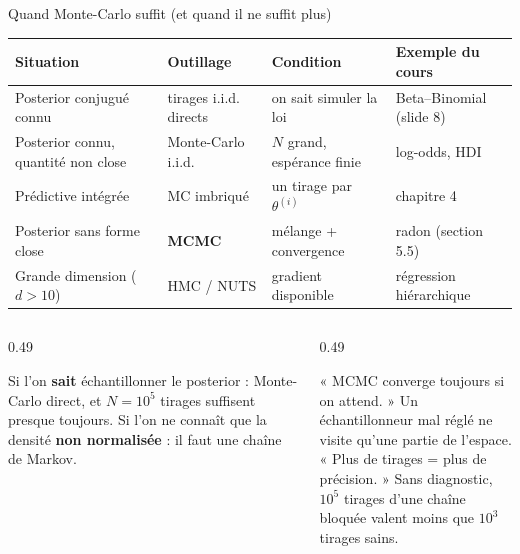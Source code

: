 \begin{frame}{Quand Monte-Carlo suffit (et quand il ne suffit plus)}
\footnotesize
\begin{center}
\footnotesize
\begin{tabular}{@{}p{3.1cm}p{3.2cm}p{3.0cm}p{3.4cm}@{}}
\toprule
\textbf{Situation} & \textbf{Outillage} & \textbf{Condition} & \textbf{Exemple du cours} \\
\midrule
Posterior conjugué connu & tirages i.i.d. directs & on sait simuler la loi & Beta--Binomial (slide 8) \\[1.5mm]
Posterior connu, quantité non close & Monte-Carlo i.i.d. & $N$ grand, espérance finie & log-odds, HDI \\[1.5mm]
Prédictive intégrée & MC imbriqué & un tirage par $\theta^{(i)}$ & chapitre 4 \\[1.5mm]
Posterior sans forme close & \textbf{MCMC} & mélange + convergence & radon (section 5.5) \\[1.5mm]
Grande dimension ($d > 10$) & HMC / NUTS & gradient disponible & régression hiérarchique \\
\bottomrule
\end{tabular}
\end{center}
\vspace{2mm}
\begin{columns}[t]
\begin{column}{0.49\textwidth}
\begin{kbox}
Si l'on \textbf{sait} échantillonner le posterior : Monte-Carlo direct, et
$N = 10^5$ tirages suffisent presque toujours. Si l'on ne connaît que la densité
\textbf{non normalisée} : il faut une chaîne de Markov.
\end{kbox}
\end{column}
\begin{column}{0.49\textwidth}
\begin{wbox}
\nok{} « MCMC converge toujours si on attend. » Un échantillonneur mal réglé ne
visite qu'une partie de l'espace.\\[1mm]
\nok{} « Plus de tirages = plus de précision. » Sans diagnostic, $10^5$ tirages
d'une chaîne bloquée valent moins que $10^3$ tirages sains.
\end{wbox}
\end{column}
\end{columns}
\end{frame}


